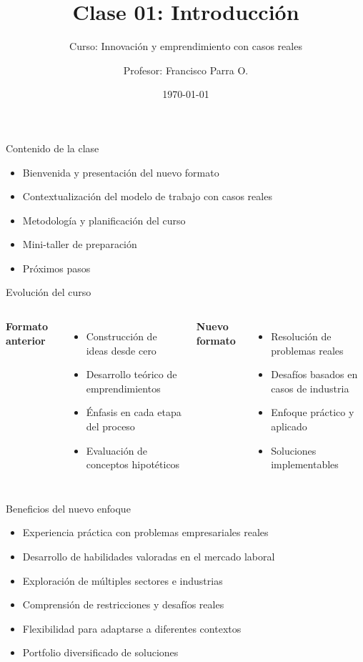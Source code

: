 \documentclass[10pt]{beamer}
\title{Clase 01: Introducción}
\subtitle{Curso: Innovación y emprendimiento con casos reales}
\author{Profesor: Francisco Parra O.}
\institute{USACH}
\date{\today}
\begin{document}
\maketitle

\begin{frame}{Contenido de la clase}
    \begin{itemize}
        \item Bienvenida y presentación del nuevo formato
        \item Contextualización del modelo de trabajo con casos reales
        \item Metodología y planificación del curso
        \item Mini-taller de preparación
        \item Próximos pasos
    \end{itemize}
\end{frame}

\begin{frame}{Evolución del curso}
  \begin{columns}
    \textbf{Formato anterior}
    \begin{itemize}
        \item Construcción de ideas desde cero
        \item Desarrollo teórico de emprendimientos
        \item Énfasis en cada etapa del proceso
        \item Evaluación de conceptos hipotéticos
    \end{itemize}
    
    \textbf{Nuevo formato}
    \begin{itemize}
        \item Resolución de problemas reales
        \item Desafíos basados en casos de industria
        \item Enfoque práctico y aplicado
        \item Soluciones implementables
    \end{itemize}
  \end{columns}
\end{frame}

\begin{frame}{Beneficios del nuevo enfoque}
    \begin{itemize}
        \item Experiencia práctica con problemas empresariales reales
        \item Desarrollo de habilidades valoradas en el mercado laboral
        \item Exploración de múltiples sectores e industrias
        \item Comprensión de restricciones y desafíos reales
        \item Flexibilidad para adaptarse a diferentes contextos
        \item Portfolio diversificado de soluciones
    \end{itemize}
\end{frame}
\end{document}
